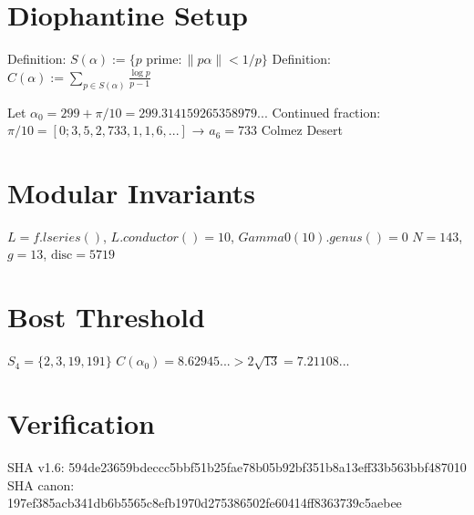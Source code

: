 \section{Diophantine Setup}
Definition: $S(\alpha) := \{ p \text{ prime} : \|p\alpha\| < 1/p \}$
Definition: $C(\alpha) := \sum_{p\in S(\alpha)} \frac{\log p}{p-1}$

Let $\alpha_0 = 299 + \pi/10 = 299.314159265358979...$
Continued fraction: $\pi/10 = [0; 3, 5, 2, 733, 1, 1, 6,...]$ → $a_6 = 733$ Colmez Desert

\section{Modular Invariants} 
$L = f.lseries()$, $L.conductor() = 10$, $Gamma0(10).genus() = 0$
$N = 143$, $g = 13$, $\text{disc} = 5719$

\section{Bost Threshold}
$S_4 = \{2, 3, 19, 191\}$
$C(\alpha_0) = 8.62945... > 2\sqrt{13} = 7.21108...$ 

\section{Verification}
SHA v1.6: 594de23659bdeccc5bbf51b25fae78b05b92bf351b8a13eff33b563bbf487010
SHA canon: 197ef385acb341db6b5565c8efb1970d275386502fe60414ff8363739c5aebee
